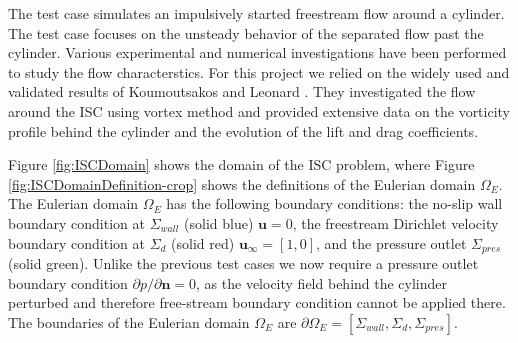 
The  test case simulates an impulsively started freestream flow around a cylinder. The test case focuses on the unsteady behavior of the separated flow past the cylinder. Various experimental and numerical investigations have been performed to study the flow characterstics. For this project we relied on the widely used and validated results of Koumoutsakos and Leonard \cite{Koumoutsakos1995a}. They investigated the flow around the ISC using vortex method and provided extensive data on the vorticity profile behind the cylinder and the evolution of the lift and drag coefficients.

Figure \ref{fig:ISCDomain} shows the domain of the ISC problem, where Figure \ref{fig:ISCDomainDefinition-crop} shows the definitions of the Eulerian domain $\Omega_E$. The Eulerian domain $\Omega_E$ has the following boundary conditions: the no-slip wall boundary condition at $\Sigma_{wall}$ (solid blue) $\mathbf{u}=0$, the freestream Dirichlet velocity boundary condition at $\Sigma_{d}$ (solid red) $\mathbf{u}_{\infty} = [1,0]$, and the pressure outlet $\Sigma_{pres}$ (solid green). Unlike the previous test cases we now require a pressure outlet boundary condition $\partial p/ \partial \mathbf{n} = 0$, as the velocity field behind the cylinder perturbed and therefore free-stream boundary condition cannot be applied there. The boundaries of the Eulerian domain $\Omega_E$ are $\partial \Omega_E = [\Sigma_{wall}, \Sigma_{d}, \Sigma_{pres}]$.

